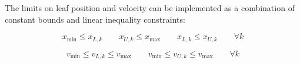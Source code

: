 The limits on leaf position and velocity can be implemented as a combination of
constant bounds and linear inequality constraints:

\begin{equation}
  x_\text{min} \leq x_{L, k}
  \quad \quad
  x_{U, k} \leq x_\text{max}
  \quad \quad
  x_{L, k} \leq x_{U, k}
  \quad \quad
  \forall k
\end{equation}

\begin{equation}
  v_\text{min} \leq v_{L,k} \leq v_\text{max}
  \quad \quad
  v_\text{min} \leq v_{U,k} \leq v_\text{max}
  \quad \quad \forall k
\end{equation}

